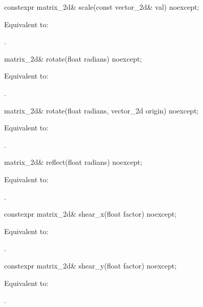 %
\begin{itemdecl}
constexpr matrix_2d& scale(const vector_2d& val) noexcept;
\end{itemdecl}
\begin{itemdescr}
\pnum
\effects
Equivalent to: 

\pnum
\returns
{}.
\end{itemdescr}

%
\begin{itemdecl}
matrix_2d& rotate(float radians) noexcept;
\end{itemdecl}
\begin{itemdescr}
\pnum
\effects
Equivalent to: 

\pnum
\returns
{}.
\end{itemdescr}

%
\begin{itemdecl}
matrix_2d& rotate(float radians, vector_2d origin) noexcept;
\end{itemdecl}
\begin{itemdescr}
\pnum
\effects
Equivalent to: 

\pnum
\returns
{}.
\end{itemdescr}

%
\begin{itemdecl}
matrix_2d& reflect(float radians) noexcept;
\end{itemdecl}
\begin{itemdescr}
\pnum
\effects
Equivalent to: 

\pnum
\returns
{}.
\end{itemdescr}

%
\begin{itemdecl}
constexpr matrix_2d& shear_x(float factor) noexcept;
\end{itemdecl}
\begin{itemdescr}
\pnum
\effects
Equivalent to: 

\pnum
\returns
{}.
\end{itemdescr}

%
\begin{itemdecl}
constexpr matrix_2d& shear_y(float factor) noexcept;
\end{itemdecl}
\begin{itemdescr}
\pnum
\effects
Equivalent to: 

\pnum
\returns
{}.
\end{itemdescr}

